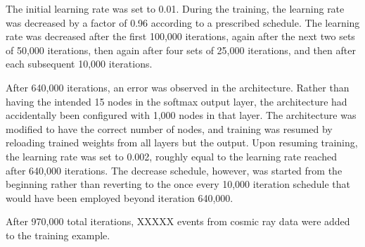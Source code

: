 The initial learning rate was set to 0.01.
During the training, the learning rate was decreased by a factor of 0.96
according to a prescribed schedule.
The learning rate was decreased after the first 100,000 iterations, again
after the next two sets of 50,000 iterations, then again after four sets of
25,000 iterations, and then after each subsequent 10,000
iterations.

After 640,000 iterations, an error was observed in the architecture.
Rather than having the intended 15 nodes in the softmax output layer,
the architecture had accidentally been configured with 1,000 nodes in that
layer.
The architecture was modified to have the correct number of nodes, and training
was resumed by reloading trained weights from all layers but the output.
Upon resuming training, the learning rate was set to 0.002, roughly equal to
the learning rate reached after 640,000 iterations.
The decrease schedule, however, was started from the beginning rather
than reverting to the once every 10,000 iteration schedule
that would have been employed beyond iteration 640,000.

After 970,000 total iterations, XXXXX events from cosmic ray data were added
to the training example.






